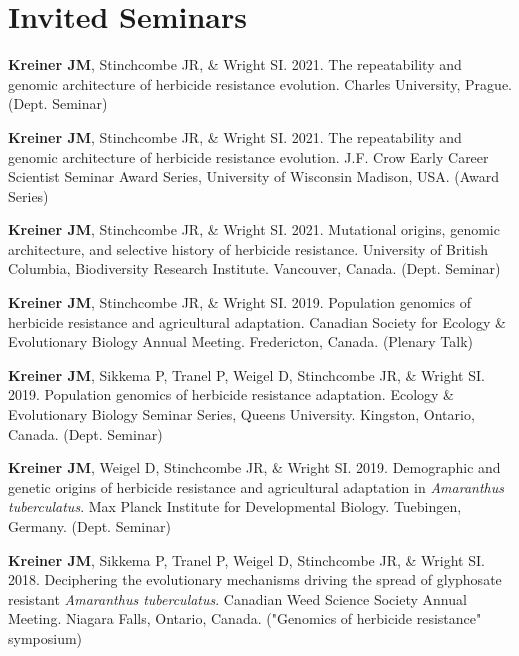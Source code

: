 \documentclass[12pt]{article}
\begin{document}


\section*{Invited Seminars}

  \textbf{Kreiner JM}, Stinchcombe JR, \& Wright SI. 2021. The repeatability and genomic architecture of herbicide resistance evolution. Charles University, Prague. (Dept. Seminar)

  \textbf{Kreiner JM}, Stinchcombe JR, \& Wright SI. 2021. The repeatability and genomic architecture of herbicide resistance evolution.  J.F. Crow Early Career Scientist Seminar Award Series, University of Wisconsin Madison, USA. (Award Series)

  \textbf{Kreiner JM}, Stinchcombe JR, \& Wright SI. 2021. Mutational origins, genomic architecture, and selective history of herbicide resistance. University of British Columbia, Biodiversity Research Institute. Vancouver, Canada. (Dept. Seminar)

  \textbf{Kreiner JM}, Stinchcombe JR, \& Wright SI. 2019. Population genomics of herbicide resistance and agricultural adaptation. Canadian Society for Ecology \& Evolutionary Biology Annual Meeting. Fredericton, Canada. (Plenary Talk)

 \textbf{Kreiner JM}, Sikkema P, Tranel P, Weigel D, Stinchcombe JR, \& Wright SI. 2019. Population genomics of herbicide resistance adaptation. Ecology \& Evolutionary Biology Seminar Series, Queens University. Kingston, Ontario, Canada. (Dept. Seminar)

 \textbf{Kreiner JM}, Weigel D, Stinchcombe JR, \& Wright SI. 2019. Demographic and genetic origins of herbicide resistance and agricultural adaptation in \textit{Amaranthus tuberculatus}. Max Planck Institute for Developmental Biology. Tuebingen, Germany. (Dept. Seminar)

 \textbf{Kreiner JM}, Sikkema P, Tranel P, Weigel D, Stinchcombe JR, \& Wright SI. 2018. Deciphering the evolutionary mechanisms driving the spread of glyphosate resistant \textit{Amaranthus tuberculatus}. Canadian Weed Science Society Annual Meeting. Niagara Falls, Ontario, Canada. ("Genomics of herbicide resistance" symposium)
\end{document}
